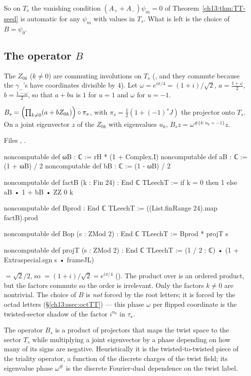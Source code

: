 So on $T_s$ the vanishing condition $(A_++A_-)\psi_m=0$ of Theorem~\ref{ch13:thm:TT-seed} is automatic for
any $\psi_m$ with values in $T_s$. What is left is the choice of $B=\psi_0$.

\subsection{\texorpdfstring{The operator $B$}{The operator B}}
The $Z_{0k}$ ($k\ne0$) are commuting involutions on $T_s$ (, and they commute because the
$\gamma_-$'s have coordinates divisible by $4$). Let $\omega=e^{i\pi/4}=(1+i)/\sqrt2$, $a=\tfrac{1+\omega}2$, $b=\tfrac{1-\omega}2$, so
that $a+bu$ is $1$ for $u=1$ and $\omega$ for $u=-1$.
\begin{definition}\label{ch13:def:Bop}
$B_s=\Bigl(\prod_{k\ne0}(a+bZ_{0k})\Bigr)\circ\pi_s$, with $\pi_s=\tfrac12(1+(-1)^sJ)$ the projector onto $T_s$. On a
joint eigenvector $z$ of the $Z_{0k}$ with eigenvalues $u_k$, $B_sz=\omega^{\#\{k:u_k=-1\}}z$.
\end{definition}
\noindent Files , .
\begin{leancode}
noncomputable def ωB : ℂ := rH * (1 + Complex.I)
noncomputable def aB : ℂ := (1 + ωB) / 2
noncomputable def bB : ℂ := (1 - ωB) / 2

noncomputable def factB (k : Fin 24) : End ℂ TLeechT := if k = 0 then 1 else aB • 1 + bB • ZZ 0 k

noncomputable def Bprod : End ℂ TLeechT := ((List.finRange 24).map factB).prod

noncomputable def Bop (s : ZMod 2) : End ℂ TLeechT := Bprod * projT s

noncomputable def projT (s : ZMod 2) : End ℂ TLeechT := (1 / 2 : ℂ) • (1 + Extraspecial.sgn s • frameJL)
\end{leancode}
\begin{dictionary}
 $=\sqrt2/2$, so  $=(1+i)/\sqrt2=e^{i\pi/4}$ (). The product over
 is an ordered product, but the factors commute so the order is irrelevant. Only
the factors $k\ne0$ are nontrivial. The choice of $B$ is \emph{not} forced by the root letters; it is
forced by the octad letters (\S\ref{ch13:ssec:octTT}) --- this phase $\omega$ per flipped coordinate is the
twisted-sector shadow of the factor $i^{n_0}$ in $\tau_\star$.
\end{dictionary}
\begin{physics}
The operator $B_s$ is a product of projectors that maps the twist space to the sector $T_s$ while multiplying a joint eigenvector by a phase depending on how many of its signs are negative. Heuristically it is the twisted-to-twisted piece of the triality operator, a function of the discrete charges of the twist field; its eigenvalue phase $\omega^{\#}$ is the discrete Fourier-dual dependence on the twist label.
\end{physics}
